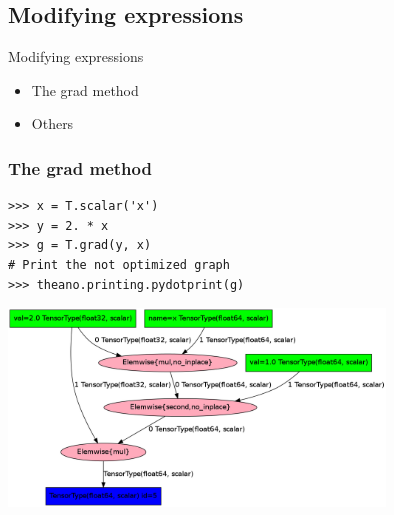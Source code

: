 \documentclass[utf8x,xcolor=pdftex,dvipsnames,table]{beamer}
\begin{document}
\subsection{Modifying expressions}
\begin{frame}{Modifying expressions}
  \begin{itemize}
  \item The grad method
  \item Others

  \end{itemize}
\end{frame}

\begin{frame}[fragile]
  \frametitle{The grad method}

\begin{lstlisting}
>>> x = T.scalar('x')
>>> y = 2. * x
>>> g = T.grad(y, x)
# Print the not optimized graph
>>> theano.printing.pydotprint(g)
\end{lstlisting}
\includegraphics[width=0.75\textwidth]{pics/theano_grad.png}
\end{frame}

\end{document}
